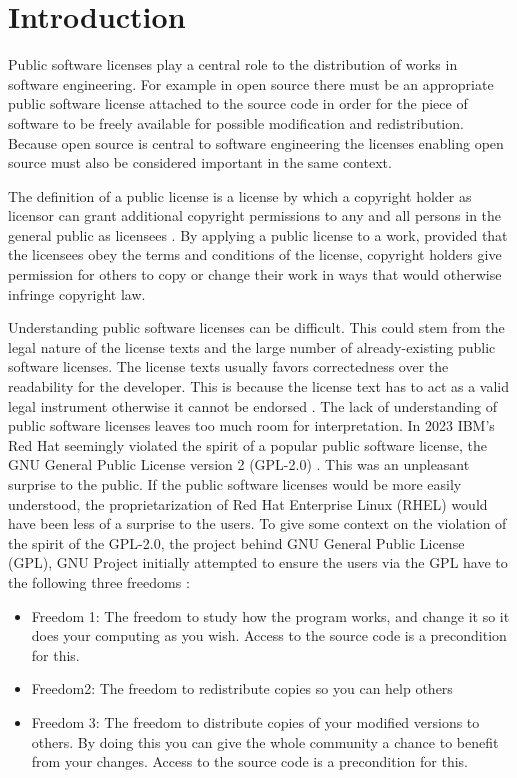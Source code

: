 \chapter{Introduction\label{intro}}
Public software licenses play a central role to the distribution of works in software engineering. For example in open source there must be an appropriate public software license attached to the source code in order for the piece of software to be freely available for possible modification and redistribution. Because open source is central to software engineering the licenses enabling open source must also be considered important in the same context.

The definition of a public license is a license by which a copyright holder as licensor can grant additional copyright permissions to any and all persons in the general public as licensees \citep{hietanen2007license}. By applying a public license to a work, provided that the licensees obey the terms and conditions of the license, copyright holders give permission for others to copy or change their work in ways that would otherwise infringe copyright law.

Understanding public software licenses can be difficult. This could stem from the legal nature of the license texts and the large number of already-existing public software licenses. The license texts usually favors correctedness over the readability for the developer. This is because the license text has to act as a valid legal instrument otherwise it cannot be endorsed \citep{ferguson2006gpl}. The lack of understanding of public software licenses leaves too much room for interpretation. In 2023 IBM's Red Hat seemingly violated the spirit of a popular public software license, the GNU General Public License version 2 (GPL-2.0) \citep{sfc:rhel, ibm:rhel}. This was an unpleasant surprise to the public. If the public software licenses would be more easily understood, the proprietarization of Red Hat Enterprise Linux (RHEL) would have been less of a surprise to the users. To give some context on the violation of the spirit of the GPL-2.0, the project behind GNU General Public License (GPL), GNU Project initially attempted to ensure the users via the GPL have to the following three freedoms \citep{gnu:free}:
\begin{itemize}
	\item Freedom 1:	The freedom to study how the program works, and change it so it does your computing as you wish. Access to the source code is a precondition for this.
	\item Freedom2: The freedom to redistribute copies so you can help others
	\item Freedom 3:	The freedom to distribute copies of your modified versions to others. By doing this you can give the whole community a chance to benefit from your changes. Access to the source code is a precondition for this.
\end{itemize}


